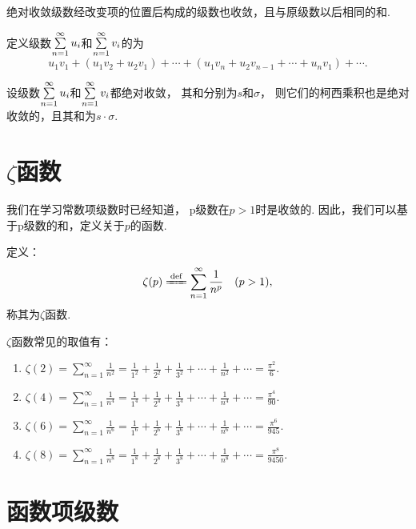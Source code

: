 \begin{property}[绝对收敛级数的可交换性]\label{theorem:无穷级数.绝对收敛级数的可交换性}
绝对收敛级数经改变项的位置后构成的级数也收敛，且与原级数以后相同的和.
\end{property}

\begin{definition}\label{definition:无穷级数.绝对收敛级数的柯西乘积}
定义级数\(\sum\limits_{n=1}^\infty u_i\)和\(\sum\limits_{n=1}^\infty v_i\)的为\[
u_1 v_1 + (u_1 v_2 + u_2 v_1) + \dotsb + (u_1 v_n + u_2 v_{n-1} + \dotsb + u_n v_1) + \dotsb.
\]
\end{definition}

\begin{theorem}\label{theorem:无穷级数.绝对收敛级数的柯西乘积必收敛}
设级数\(\sum\limits_{n=1}^\infty u_i\)和\(\sum\limits_{n=1}^\infty v_i\)都绝对收敛，
其和分别为\(s\)和\(\sigma\)，
则它们的柯西乘积也是绝对收敛的，且其和为\(s \cdot \sigma\).
\end{theorem}

\section{\texorpdfstring{\(\zeta\)}{\textzeta}函数}
我们在学习常数项级数时已经知道，
p级数在\(p>1\)时是收敛的.
因此，我们可以基于p级数的和，定义关于\(p\)的函数.
\begin{definition}
定义：\[
\zeta(p)
\defeq
\sum\limits_{n=1}^\infty \frac{1}{n^p}
\quad(p>1),
\]
称其为\(\zeta\)函数.
\end{definition}

\begin{property}
\def\zetafunc#1{\zeta(#1) = \sum\limits_{n=1}^\infty \frac{1}{n^{#1}} = \frac{1}{1^{#1}}+\frac{1}{2^{#1}}+\frac{1}{3^{#1}}+\dotsb+\frac{1}{n^{#1}}+\dotsb}
\(\zeta\)函数常见的取值有：\begin{enumerate}
\item \(\zetafunc{2} = \frac{\pi^2}{6}\).
\item \(\zetafunc{4} = \frac{\pi^4}{90}\).
\item \(\zetafunc{6} = \frac{\pi^6}{945}\).
\item \(\zetafunc{8} = \frac{\pi^8}{9450}\).
\end{enumerate}
\end{property}

\section{函数项级数}
